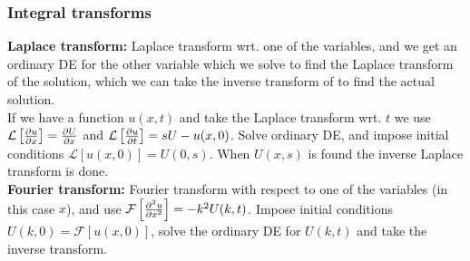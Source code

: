 \documentclass[a4paper, 10pt]{article}
\begin{document}
\begin{multicols*}{3}
\subsubsection*{Integral transforms}
\textbf{Laplace transform:}
Laplace transform wrt. one of the variables, and we get an ordinary DE for the other variable which we solve to find the Laplace transform of the solution, which we can take the inverse transform of to find the actual solution.\\
If we have a function $u(x, t)$ and take the Laplace transform wrt. $t$ we use $\mathcal{L}\left[\pdv{u}{x}\right]=\pdv{U}{x}$ and $\mathcal{L}\left[\pdv{u}{t}\right] = sU - u(x,0)$. Solve ordinary DE, and impose initial conditions $\mathcal{L}\left[u(x,0)\right] = U(0, s)$. When $U(x,s)$ is found the inverse Laplace transform is done.\\
\textbf{Fourier transform:}
Fourier transform with respect to one of the variables (in this case $x$), and use $\mathcal{F}\left[\pdv[2]{u}{x}\right] = -k^2U(k,t)$. Impose initial conditions $U(k,0)=\mathcal{F}\left[u(x,0)\right]$, solve the ordinary DE for $U(k,t)$ and take the inverse transform.


\end{multicols*}
\end{document}
